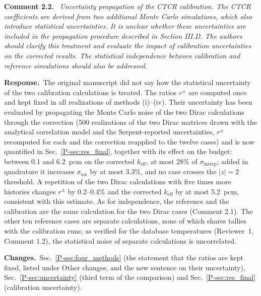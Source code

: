 \documentclass[11pt]{article}
\newenvironment{revcomment}[1]
  {\par\medskip\noindent\textbf{Comment #1.}\ \itshape}
  {\par}
\newcommand{\response}{\par\noindent\textbf{Response.}\ }
\newcommand{\changes}{\par\noindent\textbf{Changes.}\ }
\begin{document}
\begin{revcomment}{2.2}
Uncertainty propagation of the CTCR calibration. The CTCR coefficients are derived from two additional Monte Carlo simulations, which also introduce statistical uncertainties. It is unclear whether these uncertainties are included in the propagation procedure described in Section III.D. The authors should clarify this treatment and evaluate the impact of calibration uncertainties on the corrected results. The statistical independence between calibration and reference simulations should also be addressed.
\end{revcomment}
\response The original manuscript did not say how the statistical uncertainty of the two calibration calculations is treated. The ratios $r^{\pm}$ are computed once and kept fixed in all realizations of methods (i)--(iv). Their uncertainty has been evaluated by propagating the Monte Carlo noise of the two Dirac calculations through the correction (500 realizations of the two Dirac matrices drawn with the analytical correlation model and the Serpent-reported uncertainties, $r^{\pm}$ recomputed for each and the correction reapplied to the twelve cases) and is now quantified in Sec.~\ref{P-sec:res_final}, together with its effect on the budget: between 0.1 and 6.2~pcm on the corrected $k_{\text{eff}}$, at most 28\% of $\sigma_{\text{interp}}$; added in quadrature it increases $\sigma_{\text{tot}}$ by at most 3.3\%, and no case crosses the $|z|=2$ threshold. A repetition of the two Dirac calculations with five times more histories changes $r^{\pm}$ by 0.2--0.4\% and the corrected $k_{\text{eff}}$ by at most 5.2~pcm, consistent with this estimate.
As for independence, the reference and the calibration are the same calculation for the two Dirac cases (Comment 2.1). The other ten reference cases are separate calculations, none of which shares tallies with the calibration runs; as verified for the database temperatures (Reviewer~1, Comment 1.2), the statistical noise of separate calculations is uncorrelated.
\changes Sec.~\ref{P-sec:four_methods} (the statement that the ratios are kept fixed, listed under Other changes, and the new sentence on their uncertainty), Sec.~\ref{P-sec:uncertainty} (third term of the comparison) and Sec.~\ref{P-sec:res_final} (calibration uncertainty).
\end{document}
